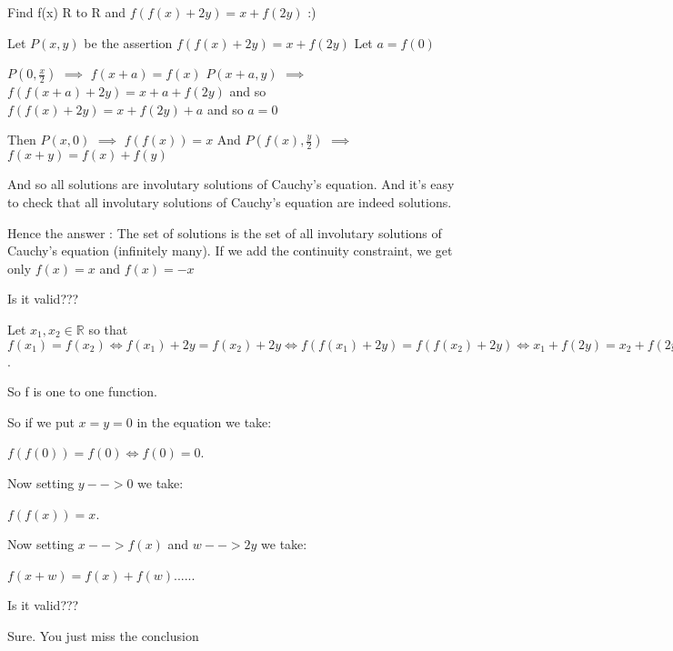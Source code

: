 \begin{solution}
	\begin{tcolorbox}Find f(x) R to R 
and $ f(f(x) + 2y) = x + f(2y)$ :)\end{tcolorbox}

Let $ P(x,y)$ be the assertion $ f(f(x) + 2y) = x + f(2y)$
Let $ a = f(0)$

$ P(0,\frac x2)$ $ \implies$ $ f(x + a) = f(x)$
$ P(x + a,y)$ $ \implies$ $ f(f(x + a) + 2y) = x + a + f(2y)$ and so $ f(f(x) + 2y) = x + f(2y) + a$ and so $ a = 0$

Then $ P(x,0)$ $ \implies$ $ f(f(x)) = x$
And $ P(f(x),\frac y2)$ $ \implies$ $ f(x + y) = f(x) + f(y)$

And so all solutions are involutary solutions of Cauchy's equation.
And it's easy to check that all involutary solutions of Cauchy's equation are indeed solutions.

Hence the answer : The set of solutions is the set of all  involutary solutions of Cauchy's equation (infinitely many).
If we add the continuity constraint, we get only $ f(x) = x$ and $ f(x) = - x$
\end{solution}



\begin{solution}
	Is it valid???

Let $ x_1,x_2 \in \mathbb{R}$ so that 
$ f(x_1) = f(x_2) \Longleftrightarrow f(x_1) + 2y = f(x_2) + 2y \Longleftrightarrow f(f(x_1) + 2y) = f(f(x_2) + 2y) \Longleftrightarrow x_1 + f(2y) = x_2 + f(2y) \Longleftrightarrow x_1 = x_2$.

So f is one to one function.

So if we put $ x = y = 0$ in the equation we take:

$ f(f(0)) = f(0) \Longleftrightarrow f(0) = 0$.

Now setting $ y - - > 0$ we take:

$ f(f(x)) = x$.

Now setting $ x - - > f(x)$ and $ w - - > 2y$ we take:

$ f(x + w) = f(x) + f(w)$......
\end{solution}



\begin{solution}
	\begin{tcolorbox}Is it valid???\end{tcolorbox}

Sure. You just miss the conclusion
\end{solution}



